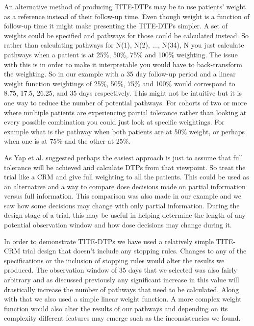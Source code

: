 An alternative method of producing TITE-DTPs may be to use patients' weight as a reference instead of their follow-up time. Even though weight is a function of follow-up time it might make presenting the TITE-DTPs simpler. A set of weights could be specified and pathways for those could be calculated instead. So rather than calculating pathways for N(1), N(2), ..., N(34), N you just calculate pathways when a patient is at 25\%, 50\%, 75\% and 100\% weighting. The issue with this is in order to make it interpretable you would have to back-transform the weighting. So in our example with a 35 day follow-up period and a linear weight function weightings of 25\%, 50\%, 75\% and 100\% would correspond to 8.75, 17.5, 26.25, and 35 days respectively. This might not be intuitive but it is one way to reduce the number of potential pathways. For cohorts of two or more where multiple patients are experiencing partial tolerance rather than looking at every possible combination you could just look at specific weightings. For example what is the pathway when both patients are at 50\% weight, or perhaps when one is at 75\% and the other at 25\%.  

As Yap et al. \cite{yapDoseTransitionPathways2017} suggested perhaps the easiest approach is just to assume that full tolerance will be achieved and calculate DTPs from that viewpoint. So treat the trial like a CRM and give full weighting to all the patients. This could be used as an alternative and a way to compare dose decisions made on partial information versus full information. This comparison was also made in our example and we saw how some decisions may change with only partial information. During the design stage of a trial, this may be useful in helping determine the length of any potential observation window and how dose decisions may change during it.  

In order to demonstrate TITE-DTPs we have used a relatively simple TITE-CRM trial design that doesn't include any stopping rules. Changes to any of the specifications or the inclusion of stopping rules would alter the results we produced. The observation window of 35 days that we selected was also fairly arbitrary and as discussed previously any significant increase in this value will drastically increase the number of pathways that need to be calculated. Along with that we also used a simple linear weight function. A more complex weight function would also alter the results of our pathways and depending on its complexity different features may emerge such as the inconsistencies we found. 

